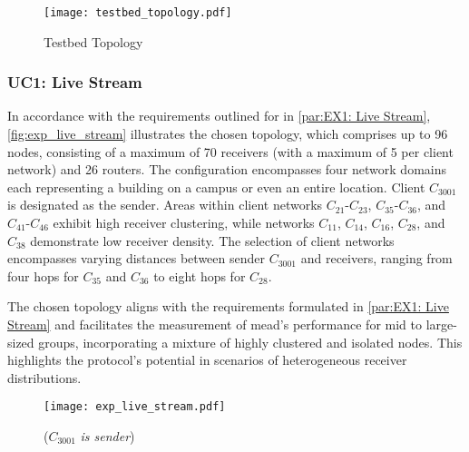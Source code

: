 \begin{figure}
    \begin{center}
        \texttt{[image: testbed\_topology.pdf]}
    \end{center}
    \caption{Testbed Topology}
    \label{fig:topology}
\end{figure}




\subsubsection{UC1: Live Stream} %
\label{par:impl UC1: Live Stream}
In accordance with the requirements outlined for \uci{} in
    \autoref{par:EX1: Live Stream}, \autoref{fig:exp_live_stream} illustrates
    the chosen topology, which comprises up to 96 nodes, consisting of a
    maximum of 70 receivers (with a maximum of 5 per client network) and 26
    routers.
The configuration encompasses four network domains each representing a building
    on a campus or even an entire location.
Client $C_{3001}$ is designated as the sender.
Areas within client networks $C_{21}$-$C_{23}$, $C_{35}$-$C_{36}$, and
    $C_{41}$-$C_{46}$ exhibit high receiver clustering, while networks
    $C_{11}$, $C_{14}$, $C_{16}$, $C_{28}$, and $C_{38}$ demonstrate low
    receiver density.
The selection of client networks encompasses varying distances between sender
    $C_{3001}$ and receivers, ranging from four hops for $C_{35}$ and $C_{36}$
    to eight hops for $C_{28}$.

The chosen topology aligns with the requirements formulated in
    \autoref{par:EX1: Live Stream} and facilitates the measurement of
    \gls{mead}'s performance for mid to large-sized groups, incorporating a
    mixture of highly clustered and isolated nodes.
This highlights the protocol's potential in scenarios of heterogeneous receiver
    distributions.

\begin{figure}
    \begin{center}
        \texttt{[image: exp\_live\_stream.pdf]}
    \end{center}
    \caption[UC1: Live Stream]{\nuci{} ($C_{3001}$ \textit{is sender})}
    \label{fig:exp_live_stream}
\end{figure}


